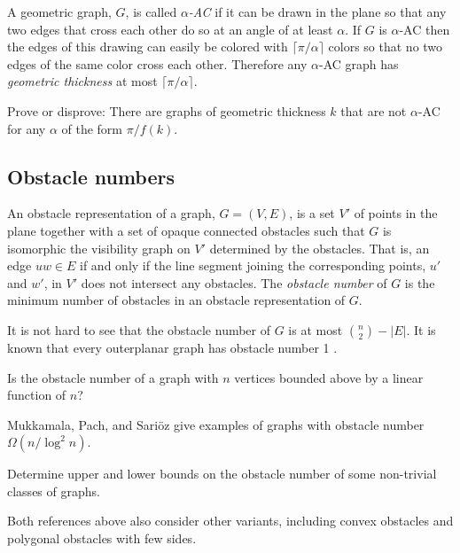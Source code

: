 \documentclass{patmorin}
\newcommand{\poser}[1]{\noindent{\textit{#1}}}
\begin{document}
\poser{Pat Morin}

A geometric graph, $G$, is called \emph{$\alpha$-AC} if it can be drawn in
the plane so that any two edges that cross each other do so at an angle of
at least $\alpha$.  If $G$ is $\alpha$-AC then the edges of this drawing
can easily be colored with $\lceil\pi/\alpha\rceil$ colors so that no
two edges of the same color cross each other. Therefore any $\alpha$-AC
graph has \emph{geometric thickness} at most $\lceil\pi/\alpha\rceil$.

\begin{op}
  Prove or disprove:  There are graphs of geometric thickness $k$ that
  are not $\alpha$-AC for any $\alpha$ of the form $\pi/f(k)$.
\end{op}

\subsection{Obstacle numbers}

\poser{Vida Dujmovi\'c}

An obstacle representation of a graph, $G=(V,E)$, is a set $V'$ of
points in the plane together with a set of opaque connected obstacles
such that $G$ is isomorphic the visibility graph on $V'$ determined
by the obstacles. That is, an edge $uw\in E$  if and only if the
line segment joining the corresponding points, $u'$ and $w'$, in $V'$
does not intersect any obstacles. The \emph{obstacle number} of $G$ is
the minimum number of obstacles in an obstacle representation of $G$.

It is not hard to see that the obstacle number of $G$ is at most
$\binom{n}{2}-|E|$.  It is known that every outerplanar graph has obstacle
number 1 \cite{akl10}.

\begin{op}
  Is the obstacle number of a graph with $n$ vertices bounded above by
  a linear function of $n$?
\end{op}

Mukkamala, Pach, and Sari\"oz \cite{mps10} give examples of graphs with
obstacle number $\Omega(n/\log^2 n)$.

\begin{op}
  Determine upper and lower bounds on the obstacle number of some non-trivial classes of graphs.
\end{op}

Both references above also consider other variants, including convex
obstacles and polygonal obstacles with few sides.
\end{document}
